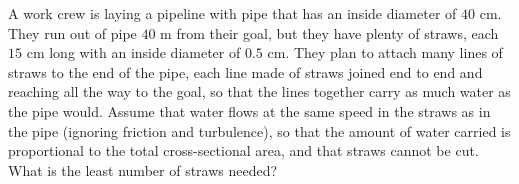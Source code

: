 A work crew is laying a pipeline with pipe that has an inside diameter of $40$ cm. They run out of pipe $40$ m from their goal, but they have plenty of straws, each $15$ cm long with an inside diameter of $0.5$ cm. They plan to attach many lines of straws to the end of the pipe, each line made of straws joined end to end and reaching all the way to the goal, so that the lines together carry as much water as the pipe would. Assume that water flows at the same speed in the straws as in the pipe (ignoring friction and turbulence), so that the amount of water carried is proportional to the total cross-sectional area, and that straws cannot be cut. What is the least number of straws needed?
